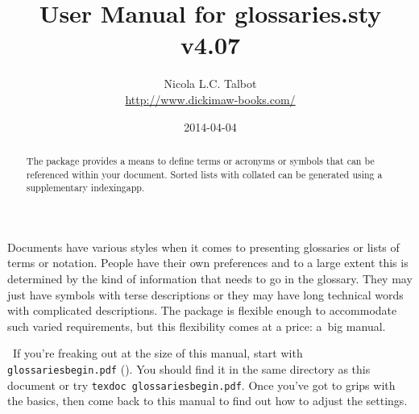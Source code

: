 \documentclass[report,inlinetitle]{nlctdoc}
\begin{document}
\DeleteShortVerb{\|}

 \title{User Manual for glossaries.sty v4.07}
 \author{Nicola L.C. Talbot\\%
  \url{http://www.dickimaw-books.com/}}

 \date{2014-04-04}
 \maketitle

\begin{abstract}
The  package provides a means to define terms or
acronyms or symbols that can be referenced within your document.
Sorted lists with collated  can be 
generated using a supplementary \gls{indexingapp}.
\end{abstract}

\begin{important}
Documents have various styles when it comes to presenting glossaries
or lists of terms or notation. People have their own preferences and
to a large extent this is determined by the kind of information that
needs to go in the glossary. They may just have symbols with
terse descriptions or they may have long technical words with
complicated descriptions. The  package is
flexible enough to accommodate such varied requirements, but this
flexibility comes at a price: a~big manual.

\aargh\ If you're freaking out at the size of this manual, start with
\texttt{glossariesbegin.pdf} (). You should find it in the same directory as this
document or try \texttt{texdoc glossariesbegin.pdf}. Once you've got
to grips with the basics, then come back to this manual to find out
how to adjust the settings.
\end{important}
\end{document}

